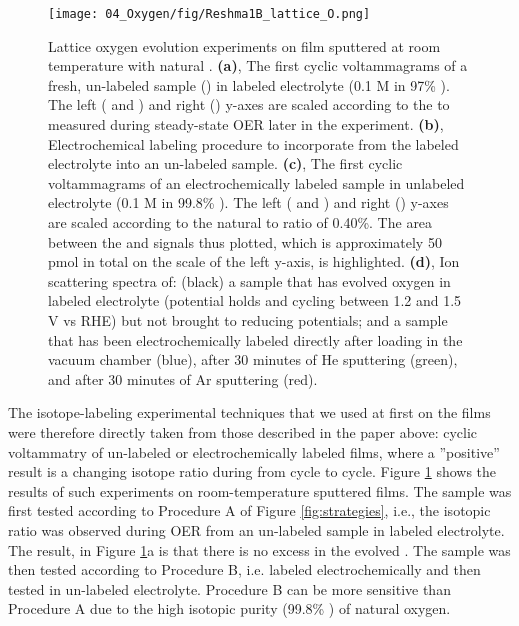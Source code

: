 \begin{figure}[h!]
	\centering
	\texttt{[image: 04\_Oxygen/fig/Reshma1B\_lattice\_O.png]}
	\caption{Lattice oxygen evolution experiments on  film sputtered at room temperature with natural . \textbf{(a)}, The first cyclic voltammagrams of a fresh, un-labeled sample () in labeled electrolyte (0.1 M  in 97\% ). The left ( and ) and right () y-axes are scaled according to the  to  measured during steady-state OER later in the experiment. \textbf{(b)}, Electrochemical labeling procedure to incorporate  from the labeled electrolyte into an un-labeled sample. \textbf{(c)}, The first cyclic voltammagrams of an electrochemically labeled sample in unlabeled electrolyte (0.1 M  in 99.8\% ). The left ( and ) and right () y-axes are scaled according to the natural  to  ratio of 0.40\%. The area between the  and  signals thus plotted, which is approximately 50 pmol in total on the scale of the left y-axis, is highlighted. \textbf{(d)}, Ion scattering spectra of: (black) a sample that has evolved oxygen in labeled electrolyte (potential holds and cycling between 1.2 and 1.5 V vs RHE) but not brought to reducing potentials; and a sample that has been electrochemically labeled directly after loading in the vacuum chamber (blue), after 30 minutes of He sputtering (green), and after 30 minutes of Ar sputtering (red).
	}
	\label{fig:Reshma1_lattice}
\end{figure}

The isotope-labeling experimental techniques that we used at first on the  films were therefore directly taken from those described in the paper above: cyclic voltammatry of un-labeled or electrochemically labeled films, where a  ''positive'' result is a changing isotope ratio during from cycle to cycle. Figure \ref{fig:Reshma1_lattice} shows the results of such experiments on room-temperature sputtered  films. The sample was first tested according to Procedure A of Figure \ref{fig:strategies}, i.e., the isotopic ratio was observed during OER from an un-labeled sample in labeled electrolyte. The result, in Figure \ref{fig:Reshma1_lattice}a is that there is no excess  in the evolved \textit{}. The sample was then tested according to Procedure B, i.e. labeled electrochemically and then tested in un-labeled electrolyte. Procedure B can be more sensitive than Procedure A due to the high isotopic purity (99.8\% ) of natural oxygen. 

